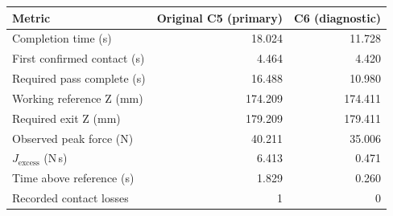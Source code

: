 \begin{tabular}{lrr}
\toprule
Metric & Original C5 (primary) & C6 (diagnostic) \\
\midrule
Completion time (s) & 18.024 & 11.728 \\
First confirmed contact (s) & 4.464 & 4.420 \\
Required pass complete (s) & 16.488 & 10.980 \\
Working reference Z (mm) & 174.209 & 174.411 \\
Required exit Z (mm) & 179.209 & 179.411 \\
Observed peak force (N) & 40.211 & 35.006 \\
$J_{\mathrm{excess}}$ (N\,s) & 6.413 & 0.471 \\
Time above reference (s) & 1.829 & 0.260 \\
Recorded contact losses & 1 & 0 \\
\bottomrule
\end{tabular}
